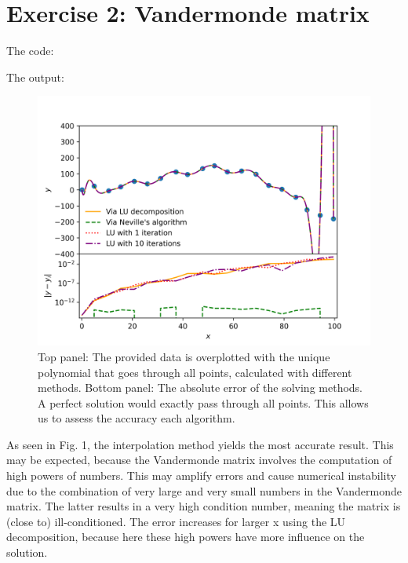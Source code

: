 \section{Exercise 2: Vandermonde matrix}

\noindent The code:



\noindent The output:



\begin{figure}[H]
    \centering
    \includegraphics[width=\textwidth]{plots/my_vandermonde_sol_2c.png}
    \caption{Top panel: The provided data is overplotted with the unique polynomial that goes through all points, calculated with different methods.
    Bottom panel: The absolute error of the solving methods. A perfect solution would exactly pass through all points. This allows us to assess the accuracy 
    each algorithm.
    } \label{fig:vdmonde}
\end{figure}

As seen in Fig. 1, the interpolation method yields the most accurate result. This may be expected, because the Vandermonde matrix 
involves the computation of high powers of numbers. This may amplify errors and cause numerical instability due to the combination of very large
and very small numbers in the Vandermonde matrix. The latter results in a very high condition number, meaning the matrix is (close to) ill-conditioned.
The error increases for larger x using the LU decomposition, because here these high powers have more influence on the solution.

